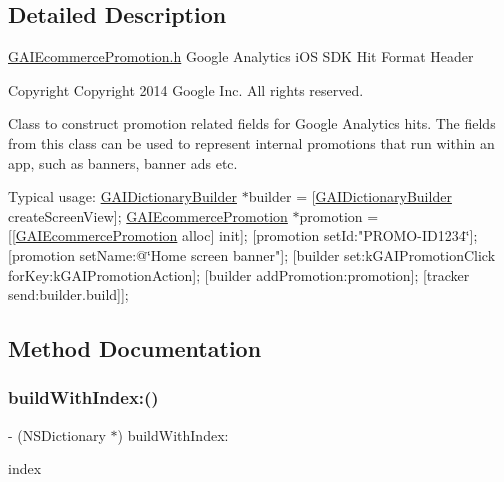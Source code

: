\subsection{Detailed Description}
\hyperlink{_g_a_i_ecommerce_promotion_8h}{G\+A\+I\+Ecommerce\+Promotion.\+h}  Google Analytics i\+OS S\+DK Hit Format Header \begin{DoxyCopyright}{Copyright}
Copyright 2014 Google Inc. All rights reserved.
\end{DoxyCopyright}
Class to construct promotion related fields for Google Analytics hits. The fields from this class can be used to represent internal promotions that run within an app, such as banners, banner ads etc.

Typical usage\+: {\ttfamily  \hyperlink{interface_g_a_i_dictionary_builder}{G\+A\+I\+Dictionary\+Builder} $\ast$builder = \mbox{[}\hyperlink{interface_g_a_i_dictionary_builder}{G\+A\+I\+Dictionary\+Builder} create\+Screen\+View\mbox{]}; \hyperlink{interface_g_a_i_ecommerce_promotion}{G\+A\+I\+Ecommerce\+Promotion} $\ast$promotion = \mbox{[}\mbox{[}\hyperlink{interface_g_a_i_ecommerce_promotion}{G\+A\+I\+Ecommerce\+Promotion} alloc\mbox{]} init\mbox{]}; \mbox{[}promotion set\+Id\+:"P\+R\+O\+M\+O-\/\+I\+D1234\char`\"{}\mbox{]};
\mbox{[}promotion set\+Name\+:@\char`\"{}Home screen banner"\mbox{]}; \mbox{[}builder set\+:k\+G\+A\+I\+Promotion\+Click for\+Key\+:k\+G\+A\+I\+Promotion\+Action\mbox{]}; \mbox{[}builder add\+Promotion\+:promotion\mbox{]}; \mbox{[}tracker send\+:builder.\+build\mbox{]}\mbox{]}; } 

\subsection{Method Documentation}
\mbox{\label{interface_g_a_i_ecommerce_promotion_a284b242448537df1f38fea7f8833f057}} 
\subsubsection{\texorpdfstring{build\+With\+Index\+:()}{buildWithIndex:()}}
{\footnotesize\ttfamily -\/ (N\+S\+Dictionary $\ast$) build\+With\+Index\+: \begin{DoxyParamCaption}\item[{(N\+S\+U\+Integer)}]{index }\end{DoxyParamCaption}}

